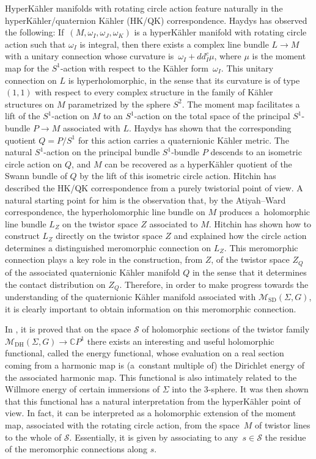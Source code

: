 \documentclass[pdftex]{sigma}
\numberwithin{equation}{section}
\theoremstyle{definition}
\newcommand\C{{\mathbb C}}
\begin{document}
HyperK\"ahler manifolds with rotating circle action feature naturally in the hyperK\"ah\-ler/quater\-nion K\"ahler (HK/QK) correspondence. Haydys \cite{Haydys} has observed the following: If~$(M, \omega_I, \omega_J,
\omega_K)$ is a hyperK\"ahler manifold with rotating circle action such that $\omega_I$ is integral, then there
exists a complex line bundle $L \longrightarrow M$ with a unitary connection whose curvature is~${\omega_I + dd^c_I\mu}$, where $\mu$ is
the moment map for the $S^1$-action with respect to the K\"ahler form~$\omega_I$. This unitary connection on $L$ is
hyperholomorphic, in the sense that its curvature is of type $(1, 1)$ with respect to every complex structure in the
family of K\"ahler structures on $M$ parametrized by the sphere $S^2$. The moment map
facilitates a lift of the $S^1$-action on $M$ to an $S^1$-action on
the total space of the principal $S^1$-bundle $P \longrightarrow M$ associated with $L$. Haydys
has shown that the corresponding
quotient $Q = P/S^1$ for this action carries a quaternionic K\"ahler metric. The natural $S^1$-action on the
principal bundle $S^1$-bundle $P$ descends to an
isometric circle action on $Q$, and $M$ can be recovered as a hyperK\"ahler quotient of the Swann bundle of $Q$ by
the lift of this isometric circle action.
Hitchin \cite{Hitchin-HKQK,Hitchin-HKQK2} has described the HK/QK correspondence from a
purely twistorial point of view. A natural starting point for him is the observation that, by the Atiyah--Ward
correspondence, the hyperholomorphic line bundle on $M$ produces a~holomorphic line bundle $L_Z$ on the twistor
space $Z$ associated to $M$. Hitchin has shown how to construct $L_Z$ directly on the twistor space $Z$ and explained how the
circle action determines a distinguished meromorphic connection on $L_Z$. This meromorphic connection plays a key
role in the construction, from $Z$, of the twistor space $Z_Q$ of the associated quaternionic K\"ahler manifold
$Q$ in the sense that it determines the contact distribution on $Z_Q$. Therefore, in order to make progress towards the
 understanding of the quaternionic K\"ahler manifold associated with $\mathcal{M}_{\mathrm{SD}}(\Sigma,G)$, it is clearly important to obtain
information on this meromorphic connection.

In \cite{BeHeRo}, it is proved that on the space $\mathcal S$ of holomorphic sections of the twistor family
$\mathcal{M}_{\mathrm{DH}}(\Sigma, G) \longrightarrow \C P^1$ there exists an interesting
and useful holomorphic functional, called the energy functional, whose
evaluation on a real section coming from a harmonic map is (a~constant multiple of) the Dirichlet energy of the
associated harmonic map. This functional is also intimately related to the Willmore energy of certain immersions of
$\Sigma$ into the 3-sphere. It was then shown that this functional has a natural interpretation from the
hyperK\"ahler point of view. In fact, it can be interpreted as a holomorphic extension of the moment map,
associated with the rotating circle action, from the space~$M$ of twistor lines to the whole of $\mathcal S$.
Essentially, it is given by associating to any~$s \in \mathcal S$ the residue of the meromorphic connections along
$s$.
\end{document}
